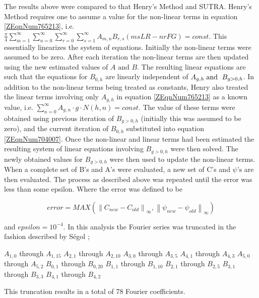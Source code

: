 \documentclass{article}
\newcommand{\spbox}[1]{ \text{ #1 }} %
\begin{document}
The results above were compared to that Henry's Method and SUTRA. Henry's Method
requires one to assume a value for the non-linear terms in equation
\eqref{ZEqnNum765213}, i.e. $\frac{\pi }{4} \sum _{m=1}^{\infty } \sum
_{n=0}^{\infty } \sum _{r=0}^{\infty } \sum _{s=1}^{\infty }A_{m,n} B_{r,s}
\left(msLR-nrFG\right) =const$. This essentially linearizes the system of
equations. Initially the non-linear terms were assumed to be zero. After each
iteration the non-linear terms are then updated using the new estimated values
of $A\spbox{and} B$. The resulting linear equations are such that the equations for
$B_{0,h} $ are linearly independent of $A_{g,h} \;  \text{and\; } B_{g>0,h}
$. In addition to the non-linear terms being treated as constants, Henry also
treated the linear terms involving only $A_{g,h} $ in equation
\eqref{ZEqnNum765213} as a known value, i.e. $\sum _{n=0}^{\infty }A_{g,n} \cdot
g\cdot N\left(h,n\right) =const$. The value of these terms were obtained using
previous iteration of $B_{g>0,h} $ (initially this was assumed to be zero), and
the current iteration of $B_{0,h} $ substituted into equation
\eqref{ZEqnNum704007}. Once the non-linear and linear terms had been estimated
the resulting system of linear equations involving $B_{g>0,h} $ were then
solved. The newly obtained values for $B_{g>0,h} $ were then used to update the
non-linear terms. When a complete set of B's and A's were evaluated, a new set
of C's and $\psi  \text{'s} $ are then evaluated. The process as described above
was repeated until the error was less than some epsilon. Where the error was
defined to be 

\begin{equation} \label{5.1} 
    error = MAX\left(\left\| C_{new} -C_{old} \right\|_{\infty } ,\left\| 
    \psi _{new} -\psi _{old} \right\| _{\infty } \right)
\end{equation} 

and $epsilon=10^{-4} $. In this analysis the Fourier series was truncated in the
fashion described by S\'egol \cite{Segol};

\begin{center}
    $A_{1,0}$ through $A_{1,15}$
    $A_{2,1}$ through $A_{2,10}$
    $A_{3,0}$ through $A_{3,5}$
    $A_{4,1}$ through $A_{4,3}$
    $A_{5,0}$ through $A_{5,2}$
    $B_{0,1}$ through $B_{0,20}$
    $B_{1,1}$ through $B_{1,10}$
    $B_{2,1}$ through $B_{2,5}$
    $B_{3,1}$ through $B_{3,3}$
    $B_{4,1}$ through $B_{4,2}$
\end{center}

This truncation results in a total of 78 Fourier coefficients. 
\end{document}

